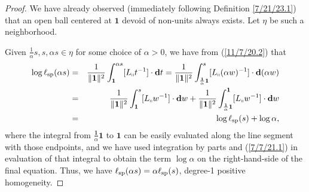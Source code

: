 \documentclass{amsart}
\numberwithin{equation}{section}
\theoremstyle{definition}
\numberwithin{theorem}{section}
\begin{document}
\begin{proof} We have already observed (immediately following Definition \ref{7/21/23.1}) that an open ball centered at $\mathbf{1}$ devoid of non-units always exists.  Let $\eta$  be such a neighborhood.

Given $\frac{1}{\alpha}s,s,\alpha s\in\eta$ for some choice of $\alpha>0$, we have from (\ref{11/7/20.2}) that
\begin{eqnarray}\nonumber  \log\ell_{\rm sp}(\alpha s) &=&  \frac{1}{\|{\bf 1}\|^2}\int_{\bf 1}^{\alpha s} [L_{\shortparallel}t^{-1}]\cdot \mathbf{d}t = \frac{1}{\|{\bf 1}\|^2}\int_{\frac{\mathbf{1}}{\alpha}\mathbf{1}}^{s} [L_{\shortparallel}(\alpha w)^{-1}]\cdot \mathbf{d}(\alpha w)  \\ \nonumber &=&  \frac{1}{\|{\bf 1}\|^2}\int_{\mathbf{1}}^{s} [L_{\shortparallel}w^{-1}]\cdot \mathbf{d}w + \frac{1}{\|{\bf 1}\|^2}\int_{\frac{\mathbf{1}}{\alpha} \mathbf{1}}^{\mathbf{1}} [L_{\shortparallel}w^{-1}]\cdot \mathbf{d}w  \\ &=& \log \ell_{\rm sp}(s) + \log\alpha, \label{4/2/23.1}
\end{eqnarray} where the integral from $\frac{\mathbf{1}}{\alpha} \mathbf{1}$ to $\mathbf{1}$ can be easily evaluated along the line segment with those endpoints, and we have used integration by parts and  (\ref{7/7/21.1}) in evaluation of that integral to  obtain the term $\log \alpha$ on the right-hand-side of the final equation.  Thus, we have $\ell_{\rm sp}(\alpha s) = \alpha\ell_{\rm sp}(s)$, degree-1 positive homogeneity.



\end{proof}
\end{document}
